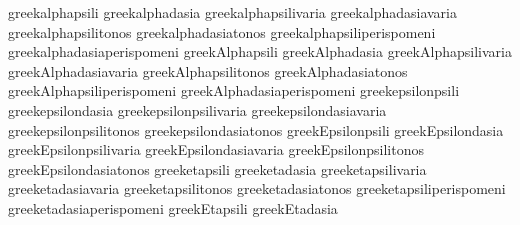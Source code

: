  greekalphapsili                     {}
 greekalphadasia                     {}
 greekalphapsilivaria                {}
 greekalphadasiavaria                {}
 greekalphapsilitonos                {}
 greekalphadasiatonos                {}
 greekalphapsiliperispomeni          {}
 greekalphadasiaperispomeni          {}
 greekAlphapsili                     {}
 greekAlphadasia                     {}
 greekAlphapsilivaria                {}
 greekAlphadasiavaria                {}
 greekAlphapsilitonos                {}
 greekAlphadasiatonos                {}
 greekAlphapsiliperispomeni          {}
 greekAlphadasiaperispomeni          {}
 greekepsilonpsili                   {} %
 greekepsilondasia                   {}
 greekepsilonpsilivaria              {}
 greekepsilondasiavaria              {}
 greekepsilonpsilitonos              {}
 greekepsilondasiatonos              {}
 greekEpsilonpsili                   {}
 greekEpsilondasia                   {}
 greekEpsilonpsilivaria              {}
 greekEpsilondasiavaria              {}
 greekEpsilonpsilitonos              {}
 greekEpsilondasiatonos              {}
 greeketapsili                       {} %
 greeketadasia                       {}
 greeketapsilivaria                  {}
 greeketadasiavaria                  {}
 greeketapsilitonos                  {}
 greeketadasiatonos                  {}
 greeketapsiliperispomeni            {}
 greeketadasiaperispomeni            {}
 greekEtapsili                       {}
 greekEtadasia                       {}
